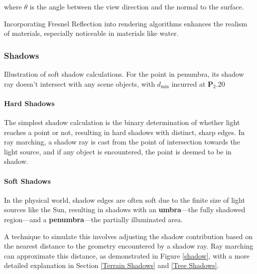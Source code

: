 where $\theta$  is the angle between the view direction and the normal to the surface.

Incorporating Fresnel Reflection into rendering algorithms enhances the realism of materials, especially noticeable in materials like water. 


\subsubsection{Shadows}
\label{Shadows}

{Illustration of soft shadow calculations. For the point in penumbra, its shadow ray doesn't intersect with any scene objects, with $d_{\text{min}}$ incurred at $\mathbf{P}_2$.}{20}


\paragraph{Hard Shadows}
The simplest shadow calculation is the binary determination of whether light reaches a point or not, resulting in hard shadows with distinct, sharp edges. In ray marching, a shadow ray is cast from the point of intersection towards the light source, and if any object is encountered, the point is deemed to be in shadow.

\paragraph{Soft Shadows}

In the physical world, shadow edges are often soft due to the finite size of light sources like the Sun, resulting in shadows with an \textbf{umbra}—the fully shadowed region—and a \textbf{penumbra}—the partially illuminated area.

A technique to simulate this involves adjusting the shadow contribution based on the nearest distance to the geometry encountered by a shadow ray. Ray marching can approximate this distance, as demonstrated in Figure \ref{shadow}, with a more detailed explanation in Section \ref{Terrain Shadows} and \ref{Tree Shadows}.



